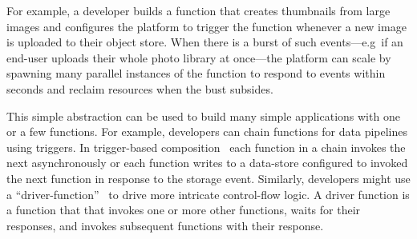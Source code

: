 For example, a developer builds a function that creates thumbnails from large
images and configures the platform to trigger the function whenever a new image
is uploaded to their object store. When there is a burst of such events---e.g\
if an end-user uploads their whole photo library at once---the platform can
scale by spawning many parallel instances of the function to respond to events
within seconds and reclaim resources when the bust subsides.

This simple abstraction can be used to build many simple applications with one
or a few functions. For example, developers can chain functions for data
pipelines using triggers. In trigger-based composition~\cite{netherite} each
function in a chain invokes the next asynchronously or each function writes to a
data-store configured to invoked the next function in response to the storage
event. Similarly, developers might use a ``driver-function''~\cite{beldi} to
drive more intricate control-flow logic. A driver function is a function that
that invokes one or more other functions, waits for their responses, and invokes
subsequent functions with their response.

